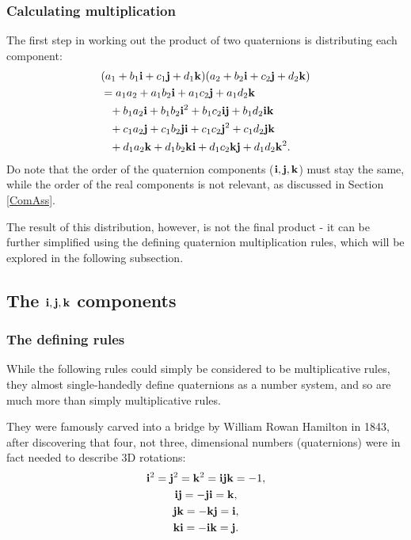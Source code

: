 \documentclass[12pt]{article}
\theoremstyle{definition}
\begin{document}
\subsubsection{Calculating multiplication}

The first step in working out the product of two quaternions is distributing each component:
\begin{equation}
    \begin{aligned}
        & (a_1 + b_1\vb{i} + c_1\vb{j} + d_1\vb{k})(a_2 + b_2\vb{i} + c_2\vb{j} + d_2\vb{k}) \\
        & = a_1a_2 + a_1b_2\vb{i} + a_1c_2\vb{j} + a_1d_2\vb{k} \\
        & \phantom{=} + b_1a_2\vb{i} + b_1b_2\vb{i}^2 + b_1c_2\vb{i}\vb{j} + b_1d_2\vb{i}\vb{k} \\
        & \phantom{=} + c_1a_2\vb{j} + c_1b_2\vb{j}\vb{i} + c_1c_2\vb{j}^2 + c_1d_2\vb{j}\vb{k} \\
        & \phantom{=} + d_1a_2\vb{k} + d_1b_2\vb{k}\vb{i} + d_1c_2\vb{k}\vb{j} + d_1d_2\vb{k}^2.
    \end{aligned}
\end{equation}
Do note that the order of the quaternion components ($\vb{i, j, k}$) must stay the same, while the order of the real components is not relevant, as discussed in Section \ref{ComAss}.

The result of this distribution, however, is not the final product - it can be further simplified using the defining quaternion multiplication rules, which will be explored in the following subsection.

\subsection{The $\vb{i, j, k}$ components}

\subsubsection{The defining rules}

While the following rules \cite{Eater} could simply be considered to be multiplicative rules, they almost single-handedly define quaternions as a number system, and so are much more than simply multiplicative rules.

They were famously carved into a bridge by William Rowan Hamilton in 1843, after discovering that four, not three, dimensional numbers (quaternions) were in fact needed to describe 3D rotations: \cite{QuaternionWiki}
\begin{subequations} \label{MultProperties1}
    \begin{gather}
        \vb{i}^2 = \vb{j}^2 = \vb{k}^2 = \vb{i}\vb{j}\vb{k} = -1, \\
        \vb{ij} = -\vb{ji} = \vb{k}, \\
        \vb{jk} = -\vb{kj} = \vb{i}, \\
        \vb{ki} = -\vb{ik} = \vb{j}.
    \end{gather}
\end{subequations}
\end{document}
